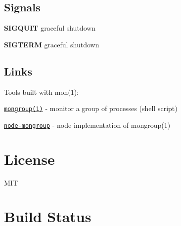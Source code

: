 \subsection*{Signals}


\begin{DoxyItemize}
\item {\bfseries S\+I\+G\+Q\+U\+IT} graceful shutdown
\item {\bfseries S\+I\+G\+T\+E\+RM} graceful shutdown
\end{DoxyItemize}

\subsection*{Links}

Tools built with {\ttfamily mon(1)}\+:


\begin{DoxyItemize}
\item \href{https://github.com/jgallen23/mongroup}{\tt mongroup(1)} -\/ monitor a group of processes (shell script)
\item \href{https://github.com/visionmedia/node-mongroup}{\tt node-\/mongroup} -\/ node implementation of mongroup(1)
\end{DoxyItemize}

\section*{License}

M\+IT

\section*{Build Status}

\href{http://travis-ci.org/visionmedia/mon}{\tt } 